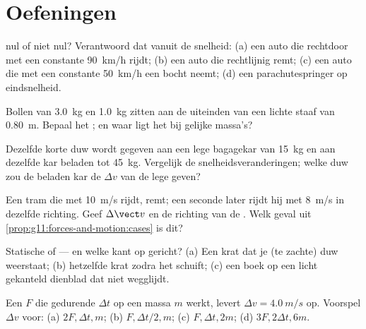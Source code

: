 \section{Oefeningen}

\begin{exercise}[$\star$]\label{exo:g11:forces-and-motion:1}
 nul of niet nul? Verantwoord dat vanuit de snelheid:
(a) een auto die rechtdoor met een constante \qty{90}{km/h} rijdt;
(b) een auto die rechtlijnig remt; (c) een auto die met een constante
\qty{50}{km/h} een bocht neemt; (d) een parachutespringer op
eindsnelheid.
\end{exercise}

\begin{exercise}[$\star$]\label{exo:g11:forces-and-motion:2}
Bollen van \qty{3.0}{kg} en \qty{1.0}{kg} zitten aan de uiteinden van een
lichte staaf van \qty{0.80}{m}. Bepaal het ; en waar ligt
het bij gelijke massa's?
\end{exercise}

\begin{exercise}[$\star$]\label{exo:g11:forces-and-motion:3}
Dezelfde korte duw wordt gegeven aan een lege bagagekar van \qty{15}{kg}
en aan dezelfde kar beladen tot \qty{45}{kg}. Vergelijk de
snelheidsveranderingen; welke duw zou de beladen kar de $\Delta v$ van de
lege geven?
\end{exercise}

\begin{exercise}[$\star$]\label{exo:g11:forces-and-motion:4}
Een tram die met \qty{10}{m/s} rijdt, remt; een seconde later rijdt hij
met \qty{8}{m/s} in dezelfde richting. Geef $\Delta \vect v$ en de
richting van de . Welk geval uit
\cref{prop:g11:forces-and-motion:cases} is dit?
\end{exercise}

\begin{exercise}[$\star$]\label{exo:g11:forces-and-motion:5}
Statische of  --- en welke kant op gericht? (a) Een
krat dat je (te zachte) duw weerstaat; (b) hetzelfde krat zodra het
schuift; (c) een boek op een licht gekanteld dienblad dat niet
wegglijdt.
\end{exercise}

\begin{exercise}[$\star\star$]\label{exo:g11:forces-and-motion:6}
Een  $F$ die gedurende $\Delta t$ op een massa $m$
werkt, levert $\Delta v = \qty{4.0}{m/s}$ op. Voorspel $\Delta v$ voor:
(a) $2F, \Delta t, m$; (b) $F, \Delta t/2, m$; (c) $F, \Delta t, 2m$;
(d) $3F, 2\Delta t, 6m$.
\end{exercise}

